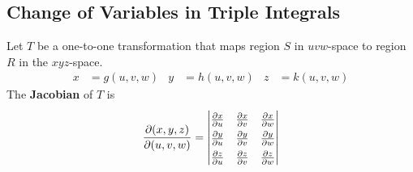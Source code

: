 \documentclass[../Calculus \Roman{3}.tex]{subfiles}
\begin{document}
			\subsection*{Change of Variables in Triple Integrals}
				Let $T$ be a one-to-one transformation that maps region $S$ in  $uvw$-space to region $R$ in the $xyz$-space.
					\begin{align*}
						x &= g(u, v, w) &
								y &= h(u, v, w) &
								z &= k(u, v, w)
					\end{align*}
					The \textbf{Jacobian} of $T$ is
						\[
							\def\arraystretch{1.4}
							\pder{(x, y, z)}{(u, v, w)} = 
								\begin{vmatrix}
									\pder{x}{u} & \pder{x}{v} & \pder{x}{w} \\
									\pder{y}{u} & \pder{y}{v} & \pder{y}{w} \\
									\pder{z}{u} & \pder{z}{v} & \pder{z}{w}
								\end{vmatrix}
						\]
\end{document}
